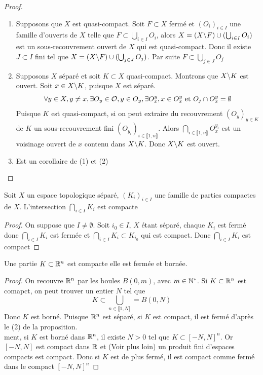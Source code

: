 \documentclass[]{report}
\begin{document}
    \begin{proof}
        \begin{enumerate}
            \item Supposons que $X$ est quasi-compact. Soit $F\subset X$ fermé et $(O_i)_{i\in I}$ une famille d'ouverts de $X$ telle que $F\subset \bigcup_{i\in I}O_i$, alors $X=(X\backslash F)\cup(\bigcup_{i\in I}O_i)$ est un sous-recouvrement ouvert de $X$ qui est quasi-compact. Donc il existe $J\subset I$ fini tel que $X=(X\backslash F)\cup (\bigcup_{j\in J}O_j)$. Par suite $F\subset\bigcup_{j\in J}O_j$
            \item Supposons $X$ séparé et soit $K\subset X$ quasi-compact. Montrons que $X\backslash K$ est ouvert. Soit $x\in X\backslash K$, puisque $X$ est séparé.
            \[\forall y\in X,y\neq x,\exists O_y\in \mathcal{O},y\in O_y,\exists O_x^y,x\in O_x^y\text{ et } O_j\cap O_x^y=\emptyset\]
            Puisque $K$ est quasi-compact, si on peut extraire du recouvrement $(O_y)_{y\in K}$ de $K$ un sous-recouvrement fini $(O_{y_i})_{i\in\llbracket 1,n\rrbracket}$. Alors $\bigcap_{i\in\llbracket1,n\rrbracket}O_x^{y_i}$ est un voisinage ouvert de $x$ contenu dans $X\backslash K$. Donc $X\backslash K$ est ouvert.
            \item Est un corollaire de (1) et (2)
        \end{enumerate}
    \end{proof}

    \begin{cor}{}{}
        Soit $X$ un espace topologique séparé, $(K_i)_{i\in I}$ une famille de parties compactes de $X$. L'intersection $\bigcap_{i\in I}K_i$ est compacte
    \end{cor}

    \begin{proof}
        On suppose que $I\neq \emptyset$. Soit $i_0\in I$, $X$ étant séparé, chaque $K_i$ est fermé donc $\bigcap_{i\in I}K_i$ est fermée et $\bigcap_{i\in I}K_i\subset K_{i_0}$ qui est compact. Donc $\bigcap_{i\in I}K_i$ est compact
    \end{proof}

    \begin{cor}{}{}
        Une partie $K\subset \mathbb{R}^n$ est compacte \ssi elle est fermée et bornée.
    \end{cor}

    \begin{proof}
        On recouvre $\mathbb{R}^n$ par les boules $B(0,m)$, avec $m\in \mathbb{N}^*$. Si $K\subset \mathbb{R}^n$ est comapct, on peut trouver un entier $N$ tel que 
        \[K\subset \bigcup_{n\in \llbracket 1,N\rrbracket}=B(0,N)\]
        Donc $K$ est borné. Puisque $\mathbb{R}^n$  est séparé, si $K$ est compact, il est fermé d'après le (2) de la proposition.\\
        ment, si $K$ est borné dans $\mathbb{R}^n$, il existe $N>0$ tel que $K\subset {\left[-N,N\right]}^n$. Or $\left[-N,N\right]$ est compact dans $\mathbb{R}$ et (Voir plus loin) un produit fini d'espaces compacts est compact. Donc si $K$ est de plus fermé, il est compact comme fermé dans le compact ${\left[-N,N\right]}^n$
    \end{proof}
\end{document}
